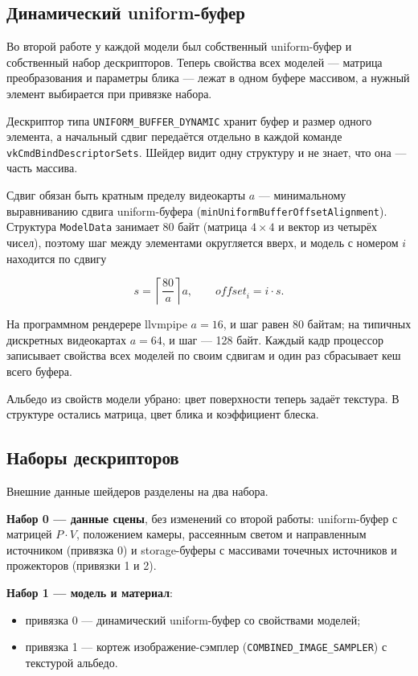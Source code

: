 \documentclass[14pt,a4paper]{extarticle}
\begin{document}
\subsection{Динамический uniform-буфер}

Во второй работе у каждой модели был собственный uniform-буфер и собственный
набор дескрипторов. Теперь свойства всех моделей — матрица преобразования и
параметры блика — лежат в одном буфере массивом, а нужный элемент выбирается
при привязке набора.

Дескриптор типа \texttt{UNIFORM\_BUFFER\_DYNAMIC} хранит буфер и размер
одного элемента, а начальный сдвиг передаётся отдельно в каждой команде
\texttt{vkCmdBindDescriptorSets}. Шейдер видит одну структуру и не знает, что
она — часть массива.

Сдвиг обязан быть кратным пределу видеокарты $a$ — минимальному
выравниванию сдвига uniform-буфера
(\texttt{minUniform\-Buffer\-Offset\-Alignment}). Структура \texttt{ModelData}
занимает 80 байт (матрица $4 \times 4$ и вектор из четырёх чисел), поэтому шаг
между элементами округляется вверх, и модель с номером $i$ находится по сдвигу

\begin{equation}
	s = \left\lceil \frac{80}{a} \right\rceil a, \qquad
	\mathit{offset}_i = i \cdot s.
\end{equation}

На программном рендерере llvmpipe $a = 16$, и шаг равен 80 байтам; на
типичных дискретных видеокартах $a = 64$, и шаг — 128 байт. Каждый кадр
процессор записывает свойства всех моделей по своим сдвигам и один раз
сбрасывает кеш всего буфера.

Альбедо из свойств модели убрано: цвет поверхности теперь задаёт текстура. В
структуре остались матрица, цвет блика и коэффициент блеска.

\subsection{Наборы дескрипторов}

Внешние данные шейдеров разделены на два набора.

\textbf{Набор 0 — данные сцены}, без изменений со второй работы:
uniform-буфер с матрицей $P \cdot V$, положением камеры, рассеянным светом и
направленным источником (привязка 0) и storage-буферы с массивами точечных
источников и прожекторов (привязки 1 и 2).

\textbf{Набор 1 — модель и материал}:

\begin{itemize}[leftmargin=*, nosep]
	\item привязка 0 — динамический uniform-буфер со свойствами моделей;
	\item привязка 1 — кортеж изображение-сэмплер
	(\texttt{COMBINED\_IMAGE\_SAMPLER}) с текстурой альбедо.
\end{itemize}
\end{document}
